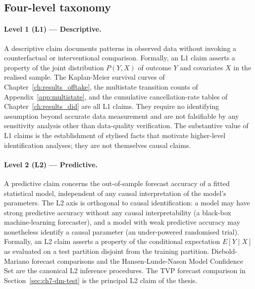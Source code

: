 \subsection{Four-level taxonomy}
\label{sec:methods_four_levels}

\paragraph{Level 1 (L1) --- Descriptive.} A descriptive claim documents patterns in observed data without invoking a counterfactual or interventional comparison. Formally, an L1 claim asserts a property of the joint distribution $P(Y, X)$ of outcome $Y$ and covariates $X$ in the realised sample. The Kaplan-Meier survival curves of Chapter~\ref{ch:results_offtake}, the multistate transition counts of Appendix~\ref{app:multistate}, and the cumulative cancellation-rate tables of Chapter~\ref{ch:results_did} are all L1 claims. They require no identifying assumption beyond accurate data measurement and are not falsifiable by any sensitivity analysis other than data-quality verification. The substantive value of L1 claims is the establishment of stylised facts that motivate higher-level identification analyses; they are not themselves causal claims.

\paragraph{Level 2 (L2) --- Predictive.} A predictive claim concerns the out-of-sample forecast accuracy of a fitted statistical model, independent of any causal interpretation of the model's parameters. The L2 axis is orthogonal to causal identification: a model may have strong predictive accuracy without any causal interpretability (a black-box machine-learning forecaster), and a model with weak predictive accuracy may nonetheless identify a causal parameter (an under-powered randomised trial). Formally, an L2 claim asserts a property of the conditional expectation $E[Y \mid X]$ as evaluated on a test partition disjoint from the training partition. Diebold-Mariano forecast comparisons \cite{diebold1995comparing, harvey1997testing} and the Hansen-Lunde-Nason Model Confidence Set \cite{hansen2011model} are the canonical L2 inference procedures. The TVP forecast comparison in Section~\ref{sec:ch7-dm-test} is the principal L2 claim of the thesis.

